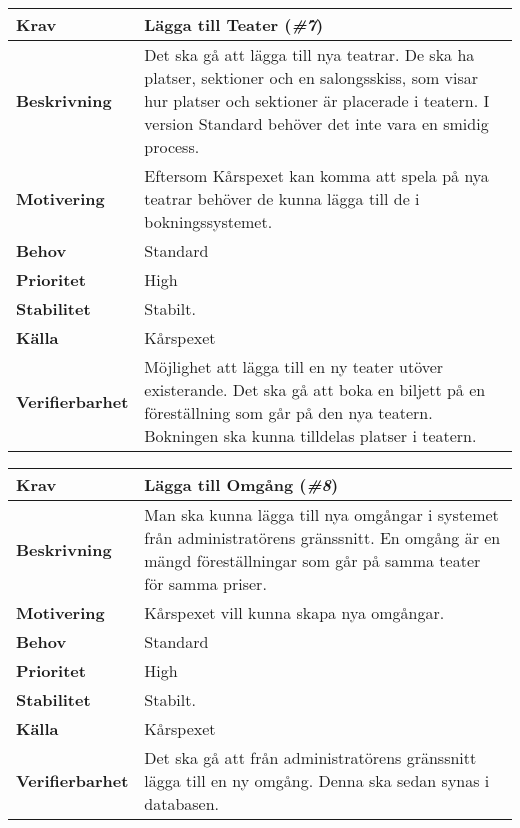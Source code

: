 \documentclass[a4paper, twoside, 11pt, titlepage]{article}
\begin{document}
	\begin{tabular} { p{2.6cm} p{12.5cm} }
		\hline
		\sffamily\textbf{Krav} & Lägga till Teater (\emph{\#7})  \\
		\hline
		\sffamily\textbf{Beskrivning} & Det ska gå att lägga till nya teatrar. De ska ha platser, sektioner och en salongsskiss, som visar hur platser och sektioner är placerade i teatern. I version Standard behöver det inte vara en smidig process.  \\
		\hline
		\sffamily\textbf{Motivering} & Eftersom Kårspexet kan komma att spela på nya teatrar behöver de kunna lägga till de i bokningssystemet.  \\
		\hline
		\sffamily\textbf{Behov} & Standard  \\
		\hline
		\sffamily\textbf{Prioritet} & High  \\
		\hline
		\sffamily\textbf{Stabilitet} & Stabilt.  \\
		\hline
		\sffamily\textbf{Källa} & Kårspexet  \\
		\hline
		\sffamily\textbf{Verifierbarhet} & Möjlighet att lägga till en ny teater utöver existerande. Det ska gå att boka en biljett på en föreställning som går på den nya teatern. Bokningen ska kunna tilldelas platser i teatern.  \\
		\hline
	\end{tabular}
	\vspace{6mm}

	\begin{tabular} { p{2.6cm} p{12.5cm} }
		\hline
		\sffamily\textbf{Krav} & Lägga till Omgång (\emph{\#8})  \\
		\hline
		\sffamily\textbf{Beskrivning} & Man ska kunna lägga till nya omgångar i systemet från administratörens gränssnitt. En omgång är en mängd föreställningar som går på samma teater för samma priser.  \\
		\hline
		\sffamily\textbf{Motivering} & Kårspexet vill kunna skapa nya omgångar.  \\
		\hline
		\sffamily\textbf{Behov} & Standard  \\
		\hline
		\sffamily\textbf{Prioritet} & High  \\
		\hline
		\sffamily\textbf{Stabilitet} & Stabilt.  \\
		\hline
		\sffamily\textbf{Källa} & Kårspexet  \\
		\hline
		\sffamily\textbf{Verifierbarhet} & Det ska gå att från administratörens gränssnitt lägga till en ny omgång. Denna ska sedan synas i databasen.   \\
		\hline
	\end{tabular}
	\vspace{6mm}
\end{document}
